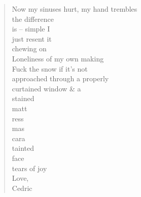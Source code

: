 \documentclass[11pt]{article}
\begin{document}
\begin{verse}
\vspace*{1em}
\hspace*{4em}Now my sinuses hurt, my hand trembles\\
\hspace*{4em}the difference\\
\hspace*{4em}is -- simple I\\
\hspace*{4em}just resent it\\
\hspace*{5em}chewing on\\
\hspace*{8em}Loneliness of my own making\\
\vspace*{1em}
\hspace*{4em}Fuck the snow if it's not\\
\hspace*{4em}approached through a properly\\
\hspace*{8em}curtained window \& a\\
\hspace*{5em}stained\\
\hspace*{12em}matt\\
\hspace*{15em}ress\\
\hspace*{22em}mas\\
\hspace*{16em}cara\\
\hspace*{8em}tainted\\
\hspace*{19em}face\\
\vspace*{1em}
\vspace*{1em}
\hspace*{6em}tears of joy\\
Love,\\
Cedric\\
\end{verse}
\end{document}
